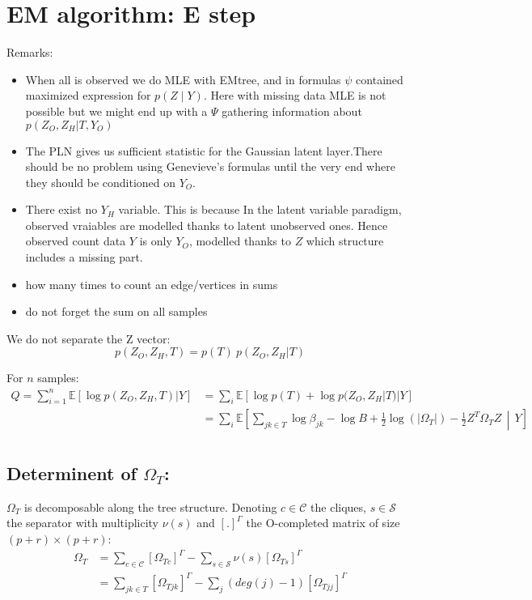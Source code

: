 \documentclass[11pt,a4paper]{article}
\newcommand{\Esp}{\mathds{E}}
\begin{document}
\section{EM algorithm: E step}

Remarks:
\begin{itemize}
\item When all is observed we do MLE with EMtree, and in formulas $\psi$ contained maximized expression for $p(Z \mid Y)$. Here with missing data MLE is not possible but we might end up with a $\Psi$ gathering information about $ p(Z_O,Z_H|T,Y_O)$
\item The PLN gives us sufficient statistic for the Gaussian latent layer.There should be no problem using Genevieve's formulas until the very end where they should be conditioned on $Y_O$.
\item There exist no $Y_H$ variable. This is because In the latent variable paradigm, observed vraiables are modelled thanks to latent unobserved ones. Hence observed count data $Y$ is only $Y_O$, modelled thanks to $Z$ which structure includes a  missing part.
\item how many times to count an edge/vertices in sums 
\item do not forget the sum on all samples
\end{itemize}



We do not separate the Z vector:
$$p(Z_O,Z_H,T) = p(T) \: p(Z_O,Z_H|T)$$

For $n$ samples:
\begin{align*}
Q= \sum_{i=1}^{n} \Esp[\log p(Z_O,Z_H,T) | Y ] &= \sum_i  \Esp[\log p(T)+\log p(Z_O,Z_H|T)|Y] \\
  &=\sum_i \Esp\left[\sum_{jk \in T} \log \beta_{jk} - \log B + \frac{1}{2} \log(|\Omega_T|) - \frac{1}{2} Z^T \Omega_T Z\,\middle\vert\,  Y\right]\\
\end{align*} 


\subsection{Determinent of $\Omega_T$:\\}
$\Omega_T$ is decomposable along the tree structure. Denoting $c\in\mathcal{C}$ the cliques, $s\in \mathcal{S}$ the separator with multiplicity $\nu(s)$ and $[.]^\Gamma$ the O-completed matrix of size $(p+r)\times(p+r)$:
\begin{align*}
\Omega_T &= \sum_{c\in \mathcal{C}} [\Omega_{Tc}]^\Gamma - \sum_{s \in\mathcal{S}} \nu(s)[\Omega_{Ts}]^\Gamma\\
&= \sum_{jk \in T} [\Omega_{Tjk}]^\Gamma - \sum_j (deg(j)-1)[\Omega_{Tjj}]^\Gamma
\end{align*}
\end{document}
